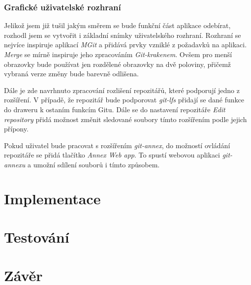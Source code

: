     \subsection{Grafické uživatelské rozhraní}
    Jelikož jsem již tušil jakým směrem se bude funkční část aplikace odebírat, rozhodl jsem se vytvořit i základní snímky uživatelského rozhraní. Rozhraní se nejvíce inspiruje aplikací \emph{MGit} a přidává prvky vzniklé z požadavků na aplikaci. \emph{Merge} se mírně inspiruje jeho zpracováním \emph{Git-krakenem}. Ovšem pro menší obrazovky bude používat jen rozdělené obrazovky na dvě poloviny, přičemž vybraná verze změny bude barevně odlišena.

    Dále je zde navrhnuto zpracování rozlišení repozitářů, které podporují jedno z rozšíření. V případě, že repozitář bude podporovat \emph{git-lfs} přidají se dané funkce do draweru k ostaním funkcím Gitu. Dále se do nastavení repozitáře \emph{Edit repository} přidá možnost změnit sledované soubory tímto rozšířením podle jejich přípony.

    Pokud uživatel bude pracovat s rozšířením \emph{git-annex}, do možností ovládání repozitáře se přidá tlačítko \emph{Annex Web app}. To spustí webovou aplikaci \emph{git-annexu} a umožní sdílení souborů i tímto způsobem.
\chapter{Implementace}
\chapter{Testování}
\chapter{Závěr}